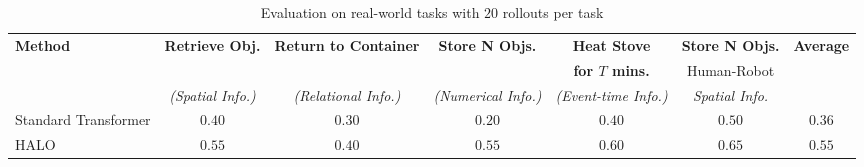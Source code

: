 % 

\begin{table}[t]
\centering
\small
\setlength{\tabcolsep}{5pt}
\renewcommand{\arraystretch}{1.2}
\vspace{-12pt}
\caption{Evaluation on real-world tasks with $20$ rollouts per task}
\vspace{-16pt}
\begin{threeparttable}
\label{tab:rw_all}
\begin{tabular}{lcccccc}
\toprule
\textbf{Method} 
& \textbf{Retrieve Obj.}
& \textbf{Return to Container}
& \textbf{Store N Objs.}
& \textbf{Heat Stove}
& \textbf{Store N Objs.}
& \textbf{Average} \\
& 
& 
& 
& \textbf{for $T$ mins.}
& Human-Robot
& \\
& \textit{(Spatial Info.)}
& \textit{(Relational Info.)}
& \textit{(Numerical Info.)}
& \textit{(Event-time Info.)}
& \textit{Spatial Info.}
& \\
\midrule
Standard Transformer & $0.40$ & $0.30$ & $0.20$ & $0.40$ & $0.50$ & $0.36$ \\
HALO                 & $\mathbf{0.55}$ & $\mathbf{0.40}$ & $\mathbf{0.55}$ & $\mathbf{0.60}$ & $\mathbf{0.65}$ & $\mathbf{0.55}$ \\
\bottomrule
\end{tabular}
\end{threeparttable}
\vspace{-10pt}
\end{table}